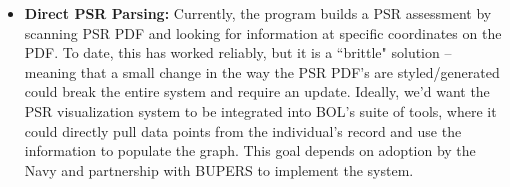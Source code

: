 \documentclass[UTF8]{article}
\begin{document}
\begin{itemize}
  \item \textbf{Direct PSR Parsing:} Currently, the program builds a PSR 
  assessment by scanning PSR PDF and looking for information at specific 
  coordinates on the PDF. To date, this has worked reliably, but it is a 
  ``brittle" solution -- meaning that a small change in the way the PSR PDF's are
  styled/generated could break the entire system and require an update.
  Ideally, we'd want the PSR visualization system to be integrated into BOL's 
  suite of tools, where it could directly pull data points from the 
  individual's record and use the information to populate the graph. This goal 
  depends on adoption by the Navy and partnership with BUPERS to implement the
  system.

\end{itemize}
\end{document}
